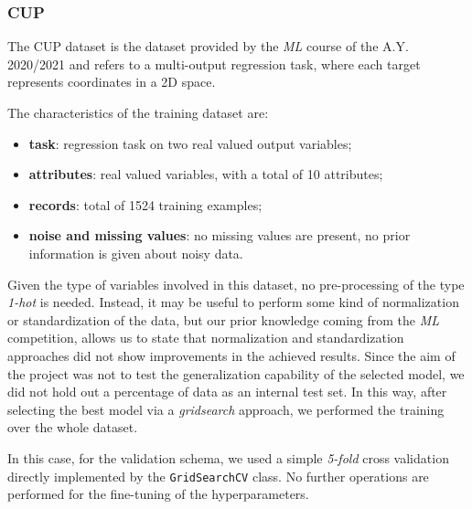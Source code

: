 \subsubsection{CUP}
The CUP dataset is the dataset provided by the \textit{ML} course of the A.Y. 2020/2021 and refers to a multi-output regression task, where each target represents coordinates in a 2D space. 

The characteristics of the training dataset are:
\begin{itemize}
    \item \textbf{task}: regression task on two real valued output variables;
    \item \textbf{attributes}: real valued variables, with a total of 10 attributes; 
    \item \textbf{records}: total of 1524 training examples;
    \item \textbf{noise and missing values}: no missing values are present, no prior information is given about noisy data.
\end{itemize}

Given the type of variables involved in this dataset, no pre-processing of the type \textit{1-hot} is needed. Instead, it may be useful to perform some kind of normalization or standardization of the data, but our prior knowledge coming from the \textit{ML} competition, allows us to state that normalization and standardization approaches did not show improvements in the achieved results. Since the aim of the project was not to test the generalization capability of the selected model, we did not hold out a percentage of data as an internal test set. In this way, after selecting the best model via a \textit{gridsearch} approach, we performed the training over the whole dataset.

In this case, for the validation schema, we used a simple \textit{5-fold} cross validation directly implemented by the \texttt{GridSearchCV} class. No further operations are performed for the fine-tuning of the hyperparameters.